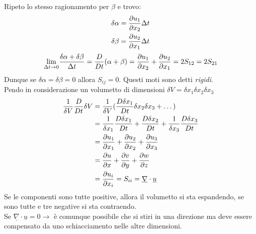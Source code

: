 Ripeto lo stesso ragionamento per $ \beta  $ e trovo:
\begin{gather*}
  \delta \alpha = \frac{\partial u_1}{\partial x_2}\Delta t\\
  \delta \beta =\frac{\partial u_2}{\partial x_1}\Delta t
\end{gather*}
\[
{\displaystyle \lim_{\Delta t\to0}} \frac{\delta \alpha +\delta \beta }{\Delta t} = \frac{D}{Dt}(\alpha +\beta ) = \frac{\partial u_1}{\partial x_2}+\frac{\partial u_2}{\partial x_1} = 2S_{12} = 2S_{21}
\]
Dunque se $ \delta \alpha =  \delta \beta = 0  $ allora $ S_{ij}=0 $. Questi moti sono detti \emph{rigidi}.\\
Pendo in considerazione un volumetto di dimensioni $ \delta V =\delta x_1\delta x_2\delta x_3 $
\begin{align*}
  \frac{1}{\delta V} \frac{D}{Dt}\delta V &= \frac{1}{\delta V}(\frac{D\delta x_1}{Dt}\delta x_2\delta x_3+\dots )\\
                                          &=\frac{1}{\delta x_1}\frac{D\delta x_1}{Dt} + \frac{D\delta x_2}{Dt} + \frac{1}{\delta x_3 }\frac{D \delta x_3}{Dt}\\
                                          &= \frac{\partial u_1}{\partial x_1} + \frac{\partial u_2}{\partial x_2}+\frac{\partial u_3}{\partial x_3}\\
                                          &=\frac{\partial u}{\partial x}+\frac{\partial v}{\partial y}+ \frac{\partial w}{\partial z}\\
  &= \frac{\partial u_i}{\partial x_i}=S_{ii}= \underline{\nabla}\cdot\underline{u} 
\end{align*}
Se le componenti sono tutte positive, allora il volumetto si sta espandendo, se sono tutte e tre negative si sta contraendo.\\
Se $ \underline{\nabla}\cdot \underline{u} = 0\to $ è comunque possibile che si stiri in una direzione ma deve essere compensato da uno schiacciamento nelle altre dimensioni.
